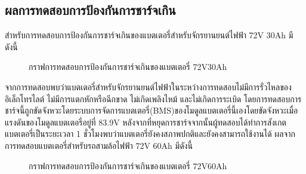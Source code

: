\subsection{ผลการทดสอบการป้องกันการชาร์จเกิน}
สำหรับการทดสอบการป้องกันการชาร์จเกินของแบตเตอรี่สำหรับจักรยานยนต์ไฟฟ้า 72V 30Ah มีดังนี้
\begin{center}
	\begin{figure}[H]
		\centering
		\captionsetup{justification=centering,margin=2cm}
		\caption{กราฟการทดสอบการป้องกันการชาร์จเกินของแบตเตอรี่ 72V30Ah}
	\end{figure}
\end{center}
จากการทดสอบพบว่าแบตเตอรี่สำหรับจักรยานยนต์ไฟฟ้าในระหว่างการทดสอบไม่มีการรั่วไหลของ\\อิเล็กโทรไลต์ ไม่มีการแตกหักหรือฉีกขาด ไม่เกิดเพลิงไหม้ และไม่เกิดการระเบิด
โดยการทดสอบการชาร์จนี้ถูกขัดจังหวะโดยระบบการจัดการแบตเตอรี่(BMS)ของโมดูลแบตเตอรี่นี้เองโดยขัดจังหวะเมื่อแรงดันของโมดูลแบตเตอรี่อยู่ที่ 83.9V 
หลังจากที่หยุดการชาร์จจากนั้นผู้ทดสอบได้ทำการสังเกตแบตเตอรี่เป็นระยะเวลา 1 ชั่วโมงพบว่าแบตเตอรี่ยังคงสภาพปกติและยังคงสามารถใช้งานได้
\newline\hspace*{2cm}
ผลจากการทดสอบแบตเตอรี่สำหรับรถสามล้อไฟฟ้า 72V 60Ah มีดังนี้
\begin{center}
	\begin{figure}[H]
		\centering
		\captionsetup{justification=centering,margin=2cm}
		\caption{กราฟการทดสอบการป้องกันการชาร์จเกินของแบตเตอรี่ 72V60Ah}
	\end{figure}
\end{center}
